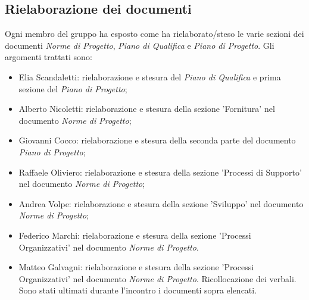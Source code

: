 \documentclass[a4paper, 12pt]{article}
\begin{document}
\subsection{Rielaborazione dei documenti}
Ogni membro del gruppo ha esposto come ha rielaborato/steso le varie sezioni dei documenti \textit{Norme di Progetto}, \textit{Piano di Qualifica} e \textit{Piano di Progetto}. Gli argomenti trattati sono: 
\begin{itemize}
	\item Elia Scandaletti: rielaborazione e stesura del \textit{Piano di Qualifica} e prima sezione del \textit{Piano di Progetto};
	\item Alberto Nicoletti: rielaborazione e stesura della sezione 'Fornitura' nel documento \textit{Norme di Progetto};
	\item Giovanni Cocco: rielaborazione e stesura della seconda parte del documento \textit{Piano di Progetto};
	\item Raffaele Oliviero: rielaborazione e stesura della sezione 'Processi di Supporto' nel documento \textit{Norme di Progetto};
	\item Andrea Volpe: rielaborazione e stesura della sezione 'Sviluppo' nel documento \textit{Norme di Progetto};
	\item Federico Marchi: rielaborazione e stesura della sezione 'Processi Organizzativi' nel documento \textit{Norme di Progetto}.
	\item Matteo Galvagni: rielaborazione e stesura della sezione 'Processi Organizzativi' nel documento \textit{Norme di Progetto}. Ricollocazione dei verbali.
Sono stati ultimati durante l'incontro i documenti sopra elencati.
\end{itemize}
\end{document}
